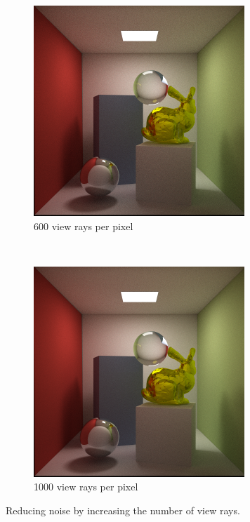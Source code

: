 \documentclass[a4paper, 12pt]{report}
\begin{document}
\begin{figure}
	\begin{subfigure}[h]{0.5\textwidth}
                \includegraphics[width=\textwidth]{figures/specular_600rpp-.png}
                \caption{600 view rays per pixel}
                \label{fig:600rpp}
        \end{subfigure}%
	~
	\begin{subfigure}[h]{0.5\textwidth}
                \includegraphics[width=\textwidth]{figures/specular_1000rpp.png}
                \caption{1000 view rays per pixel}
                \label{fig:1000rpp}
        \end{subfigure}
        \caption{Reducing noise by increasing the number of view rays.}\label{fig:vew_rays}
\end{figure}
\end{document}

